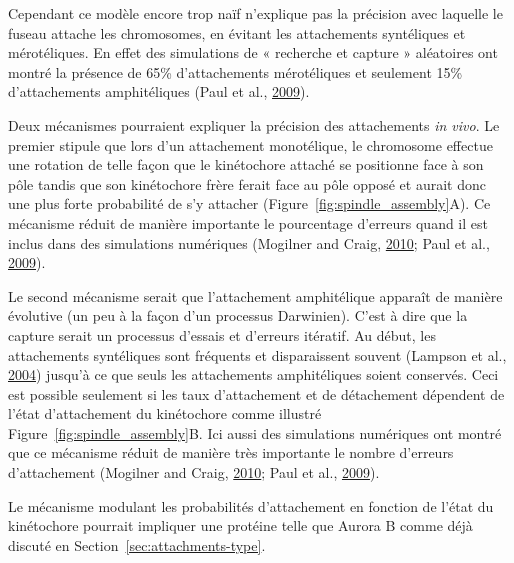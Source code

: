 \documentclass[12pt,a4paper,twoside,openright]{book}
\begin{document}
Cependant ce modèle encore trop naïf n'explique pas la précision avec
laquelle le fuseau attache les chromosomes, en évitant les attachements
syntéliques et mérotéliques. En effet des simulations de « recherche et
capture » aléatoires ont montré la présence de 65\% d'attachements
mérotéliques et seulement 15\% d'attachements amphitéliques (Paul et
al., \hyperref[ref-Paul2009]{2009}).

Deux mécanismes pourraient expliquer la précision des attachements
\emph{in vivo}. Le premier stipule que lors d'un attachement
monotélique, le chromosome effectue une rotation de telle façon que le
kinétochore attaché se positionne face à son pôle tandis que son
kinétochore frère ferait face au pôle opposé et aurait donc une plus
forte probabilité de s'y attacher (Figure~\ref{fig:spindle_assembly}A).
Ce mécanisme réduit de manière importante le pourcentage d'erreurs quand
il est inclus dans des simulations numériques (Mogilner and Craig,
\hyperref[ref-Mogilner2010]{2010}; Paul et al.,
\hyperref[ref-Paul2009]{2009}).

Le second mécanisme serait que l'attachement amphitélique apparaît de
manière évolutive (un peu à la façon d'un processus Darwinien). C'est à
dire que la capture serait un processus d'essais et d'erreurs itératif.
Au début, les attachements syntéliques sont fréquents et disparaissent
souvent (Lampson et al., \hyperref[ref-Lampson2004]{2004}) jusqu'à ce
que seuls les attachements amphitéliques soient conservés. Ceci est
possible seulement si les taux d'attachement et de détachement dépendent
de l'état d'attachement du kinétochore comme illustré
Figure~\ref{fig:spindle_assembly}B. Ici aussi des simulations numériques
ont montré que ce mécanisme réduit de manière très importante le nombre
d'erreurs d'attachement (Mogilner and Craig,
\hyperref[ref-Mogilner2010]{2010}; Paul et al.,
\hyperref[ref-Paul2009]{2009}).

Le mécanisme modulant les probabilités d'attachement en fonction de
l'état du kinétochore pourrait impliquer une protéine telle que Aurora B
comme déjà discuté en Section~\ref{sec:attachments-type}.
\end{document}

